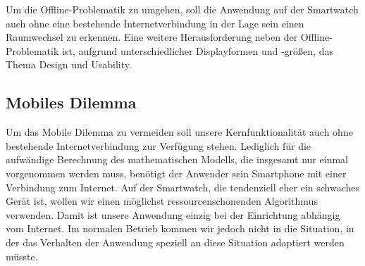 Um die Offline-Problematik zu umgehen, soll die Anwendung auf der Smartwatch auch ohne eine bestehende Internetverbindung in der Lage sein einen Raumwechsel zu erkennen. Eine weitere Herausforderung neben der Offline-Problematik ist, aufgrund unterschiedlicher Displayformen und -größen, das Thema Design und Usability.

\subsection{Mobiles Dilemma}
Um das Mobile Dilemma zu vermeiden soll unsere Kernfunktionalität auch ohne bestehende Internetverbindung zur Verfügung stehen. Lediglich für die aufwändige Berechnung des mathematischen Modells, die insgesamt nur einmal vorgenommen werden muss, benötigt der Anwender sein Smartphone mit einer Verbindung zum Internet. Auf der Smartwatch, die tendenziell eher ein schwaches Gerät ist, wollen wir einen möglichst ressourcenschonenden Algorithmus verwenden. Damit ist unsere Anwendung einzig bei der Einrichtung abhängig vom Internet. Im normalen Betrieb kommen wir jedoch nicht in die Situation, in der das Verhalten der Anwendung speziell an diese Situation adaptiert werden müsste.



